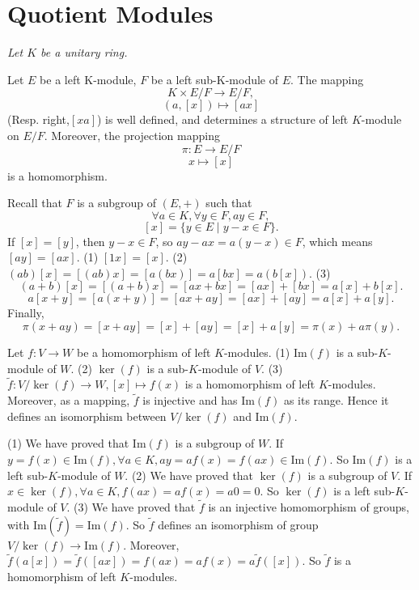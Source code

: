 \section{Quotient Modules}
\textit{Let $K$ be a unitary ring.}
\begin{propositionenv}
    Let $E$ be a left K-module, $F$ be a left sub-K-module of $E$. The mapping
    $$K\times E/ F\longrightarrow E/ F,$$
    $$(a,[x])\longmapsto [ax]$$
    (Resp. right,$[xa]$) is well defined, and determines a structure of left $K$-module on $E/ F$. Moreover, the projection mapping
    $$\pi:E\longrightarrow E/ F$$
    $$x\longmapsto [x]$$
    is a homomorphism.
\end{propositionenv}
\begin{proofenv}
    Recall that $F$ is a subgroup of $(E,+)$ such that 
    $$\forall a\in K, \forall y\in F, ay\in F,$$
    $$[x]=\{y\in E\mid y-x\in F\}.$$
    If $[x]=[y]$, then $y-x\in F$, so $ay-ax=a(y-x)\in F$, which means $[ay]=[ax]$.
    \newline
    (1) $[1x]=[x]$.
    \newline
    (2) $(ab)[x]=[(ab)x]=[a(bx)]=a[bx]=a(b[x])$.
    \newline
    (3) $$(a+b)[x]=[(a+b)x]=[ax+bx]=[ax]+[bx]=a[x]+b[x].$$
    $$a[x+y]=[a(x+y)]=[ax+ay]=[ax]+[ay]=a[x]+a[y].$$
    Finally,
    $$\pi(x+ay)=[x+ay]=[x]+[ay]=[x]+a[y]=\pi(x)+a\pi(y).$$
\end{proofenv}
\begin{theoremenv}
    Let $f:V\rightarrow W$ be a homomorphism of left $K$-modules.
    \newline
    (1) $\mathrm{Im}(f)$ is a sub-$K$-module of $W$.
    \newline
    (2) $\ker(f)$ is a sub-$K$-module of $V$.
    \newline
    (3) $\tilde{f}:V/\ker(f)\longrightarrow W,[x]\longmapsto f(x)$ is a homomorphism of left $K$-modules. Moreover, as a mapping, $\tilde{f}$ is injective and has $\mathrm{Im}(f)$ as its range. Hence it defines an isomorphism between $V/\ker(f)$ and $\mathrm{Im}(f)$.
\end{theoremenv}
\begin{proofenv}
    \quad
    \newline
    (1) We have proved that $\mathrm{Im}(f)$ is a subgroup of $W$. If $y=f(x)\in \mathrm{Im}(f), \forall a\in K, ay=af(x)=f(ax)\in \mathrm{Im}(f)$. So $\mathrm{Im}(f)$ is a left sub-$K$-module of $W$.
    \newline
    (2) We have proved that $\ker(f)$ is a subgroup of $V$. If $x\in \ker(f), \forall a\in K, f(ax)=af(x)=a0=0$. So $\ker(f)$ is a left sub-$K$-module of $V$.
    \newline
    (3) We have proved that $\tilde{f}$ is an injective homomorphism of groups, with $\mathrm{Im}(\tilde{f})=\mathrm{Im}(f)$. So $\tilde{f}$ defines an isomorphism of group $V/\ker(f)\longrightarrow \mathrm{Im}(f)$. Moreover, $\tilde{f}(a[x])=\tilde{f}([ax])=f(ax)=af(x)=a\tilde{f}([x])$. So $\tilde{f}$ is a homomorphism of left $K$-modules.
\end{proofenv}



